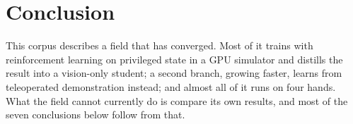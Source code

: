 \section{Conclusion}
\label{sec:gaps}
\label{sec:conclusion}

This corpus describes a field that has converged. Most of it trains with reinforcement learning
on privileged state in a GPU simulator and distills the result into a vision-only student; a
second branch, growing faster, learns from teleoperated demonstration instead; and almost all of
it runs on four hands. What the field cannot currently do is compare its own results, and most
of the seven conclusions below follow from that.

